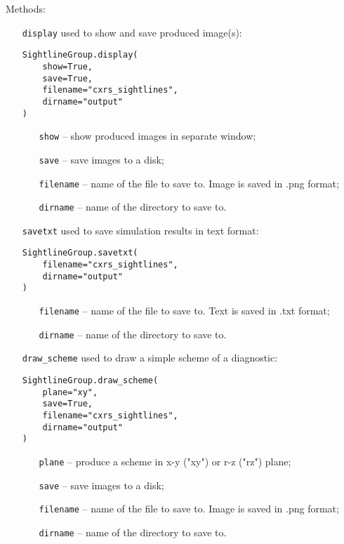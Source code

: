 \documentclass[../../main]{subfiles}
\begin{document}
Methods:
\begin{itemize}[align=left]
    \item[\texttt{display}] used to show and save produced image(s):
          \begin{verbatim}
SightlineGroup.display(
    show=True,
    save=True,
    filename="cxrs_sightlines",
    dirname="output"
)
        \end{verbatim}
          \begin{itemize}[align=left]
              \item[\texttt{show}] -- show produced images in separate window;
              \item[\texttt{save}] -- save images to a disk;
              \item[\texttt{filename}] -- name of the file to save to. Image is saved in .png format;
              \item[\texttt{dirname}] -- name of the directory to save to.
          \end{itemize}

    \item[\texttt{savetxt}] used to save simulation results in text format:
          \begin{verbatim}
SightlineGroup.savetxt(
    filename="cxrs_sightlines",
    dirname="output"
)
        \end{verbatim}
          \begin{itemize}[align=left]
              \item[\texttt{filename}] -- name of the file to save to. Text is saved in .txt format;
              \item[\texttt{dirname}] -- name of the directory to save to.
          \end{itemize}

    \item[\texttt{draw\_scheme}] used to draw a simple scheme of a diagnostic:
          \begin{verbatim}
SightlineGroup.draw_scheme(
    plane="xy",
    save=True,
    filename="cxrs_sightlines",
    dirname="output"
)
        \end{verbatim}
          \begin{itemize}[align=left]
              \item[\texttt{plane}] -- produce a scheme in x-y ("xy") or r-z ("rz") plane;
              \item[\texttt{save}] -- save images to a disk;
              \item[\texttt{filename}] -- name of the file to save to. Image is saved in .png format;
              \item[\texttt{dirname}] -- name of the directory to save to.
          \end{itemize}
\end{itemize}
\end{document}
